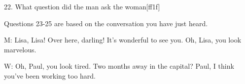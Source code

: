 \documentclass[12pt]{article}
\begin{document}
22. What question did the man ask the woman[ff1f]
\vspace{0.00mm}

\vspace{0.00mm}
\setlength{\parindent}{0.00mm}
\setlength{\leftskip}{-6.23mm}
\setlength{\rightskip}{0.00mm}


\vspace{0.00mm}

\vspace{0.00mm}
\setlength{\parindent}{0.00mm}
\setlength{\leftskip}{-6.23mm}
\setlength{\rightskip}{0.00mm}

Questions 23-25 are based on the conversation you have just heard.
\vspace{0.00mm}

\vspace{0.00mm}
\setlength{\parindent}{0.00mm}
\setlength{\leftskip}{-6.23mm}
\setlength{\rightskip}{0.00mm}


\vspace{0.00mm}

\vspace{0.00mm}
\setlength{\parindent}{0.00mm}
\setlength{\leftskip}{-6.23mm}
\setlength{\rightskip}{0.00mm}

M: Lisa, Lisa! Over here, darling! It's wonderful to see you. Oh, Lisa, you look marvelous.
\vspace{0.00mm}

\vspace{0.00mm}
\setlength{\parindent}{0.00mm}
\setlength{\leftskip}{-6.23mm}
\setlength{\rightskip}{0.00mm}


\vspace{0.00mm}

\vspace{0.00mm}
\setlength{\parindent}{0.00mm}
\setlength{\leftskip}{-6.23mm}
\setlength{\rightskip}{0.00mm}

W: Oh, Paul, you look tired. Two months away in the capital? Paul, I think you've been working too hard.
\vspace{0.00mm}

\vspace{0.00mm}
\setlength{\parindent}{0.00mm}
\setlength{\leftskip}{-6.23mm}
\setlength{\rightskip}{0.00mm}


\vspace{0.00mm}

\vspace{0.00mm}
\setlength{\parindent}{0.00mm}
\setlength{\leftskip}{-6.23mm}
\setlength{\rightskip}{0.00mm}
\end{document}
